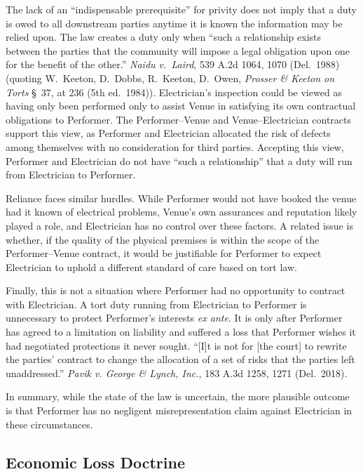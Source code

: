 \documentclass[
  12pt,
  letterpaper,
]{scrartcl}
\begin{document}
The lack of an ``indispensable prerequisite'' for privity does not imply
that a duty is owed to all downstream parties anytime it is known the
information may be relied upon. The law creates a duty only when ``such
a relationship exists between the parties that the community will impose
a legal obligation upon one for the benefit of the other.'' \emph{Naidu
v.~Laird}, 539 A.2d 1064, 1070 (Del.~1988) (quoting W.~Keeton, D.~Dobbs,
R.~Keeton, D.~Owen, \emph{Prosser \& Keeton on Torts} §~37, at 236 (5th
ed.~1984)). Electrician's inspection could be viewed as having only been
performed only to assist Venue in satisfying its own contractual
obligations to Performer. The Performer--Venue and Venue--Electrician
contracts support this view, as Performer and Electrician allocated the
risk of defects among themselves with no consideration for third
parties. Accepting this view, Performer and Electrician do not have
``such a relationship'' that a duty will run from Electrician to
Performer.

Reliance faces similar hurdles. While Performer would not have booked
the venue had it known of electrical problems, Venue's own assurances
and reputation likely played a role, and Electrician has no control over
these factors. A related issue is whether, if the quality of the
physical premises is within the scope of the Performer--Venue contract,
it would be justifiable for Performer to expect Electrician to uphold a
different standard of care based on tort law.

Finally, this is not a situation where Performer had no opportunity to
contract with Electrician. A tort duty running from Electrician to
Performer is unnecessary to protect Performer's interests \emph{ex
ante}. It is only after Performer has agreed to a
limitation on liability and suffered a loss that Performer wishes it
had negotiated protections it never sought. ``{[}I{]}t is not for {[}the
court{]} to rewrite the parties' contract to change the allocation of a
set of risks that the parties left unaddressed.'' \emph{Pavik v. George
\& Lynch, Inc.}, 183 A.3d 1258, 1271 (Del.~2018).

In summary, while the state of the law is uncertain, the more plausible outcome is
that Performer has no negligent misrepresentation claim against
Electrician in these circumstances.

\hypertarget{economic-loss-doctrine}{%
\subsection{Economic Loss Doctrine}\label{economic-loss-doctrine}}
\end{document}
